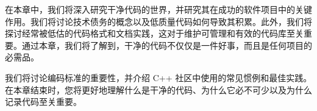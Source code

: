 在本章中，我们将深入研究干净代码的世界，并研究其在成功的软件项目中的关键作用。我们将讨论技术债务的概念以及低质量代码如何导致其积累。此外，我们将探讨经常被低估的代码格式和文档实践，这对于维护可管理和有效的代码库至关重要。通过本章，我们将了解到，干净的代码不仅仅是一件好事，而且是任何项目的必需品。

我们将讨论编码标准的重要性，并介绍 C++ 社区中使用的常见惯例和最佳实践。在本章结束时，您将更好地理解什么是干净的代码、为什么它必不可少以及为什么记录代码至关重要。
